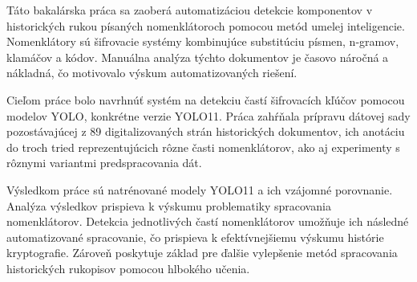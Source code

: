 Táto bakalárska práca sa zaoberá automatizáciou detekcie komponentov v historických rukou písaných nomenklátoroch pomocou metód umelej inteligencie. Nomenklátory sú šifrovacie systémy kombinujúce substitúciu písmen, n-gramov, klamáčov a kódov. Manuálna analýza týchto dokumentov je časovo náročná a nákladná, čo motivovalo výskum automatizovaných riešení. 

Cieľom práce bolo navrhnúť systém na detekciu častí šifrovacích kľúčov pomocou modelov YOLO, konkrétne verzie YOLO11. Práca zahŕňala prípravu dátovej sady pozostávajúcej z 89 digitalizovaných strán historických dokumentov, ich anotáciu do troch tried reprezentujúcich rôzne časti nomenklátorov, ako aj experimenty s rôznymi variantmi predspracovania dát. 

Výsledkom práce sú natrénované modely YOLO11 a ich vzájomné porovnanie. Analýza výsledkov prispieva k výskumu problematiky spracovania nomenklátorov. Detekcia jednotlivých častí nomenklátorov umožňuje ich následné automatizované spracovanie, čo prispieva k efektívnejšiemu výskumu histórie kryptografie. Zároveň poskytuje základ pre ďalšie vylepšenie metód spracovania historických rukopisov pomocou hlbokého učenia. 